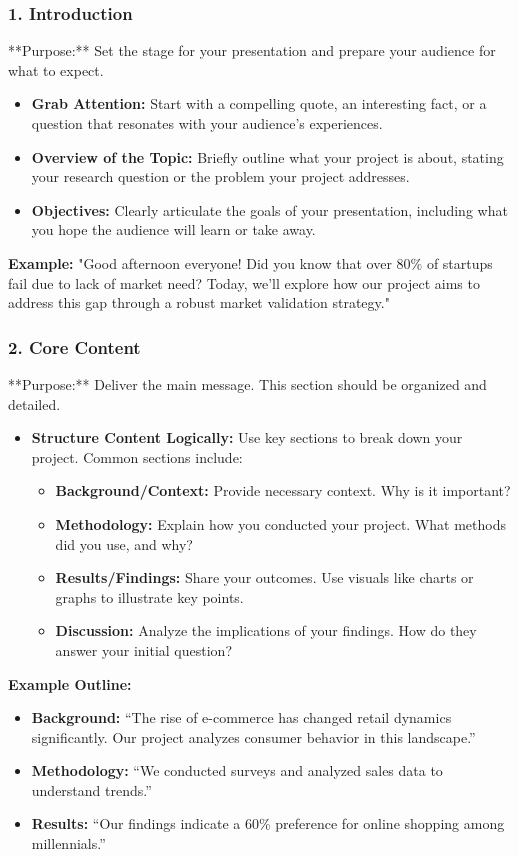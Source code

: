 \documentclass{beamer}
\begin{document}
\begin{frame}[fragile]
    \frametitle{1. Introduction}
    **Purpose:** Set the stage for your presentation and prepare your audience for what to expect.
    \begin{itemize}
        \item \textbf{Grab Attention:} Start with a compelling quote, an interesting fact, or a question that resonates with your audience's experiences.
        \item \textbf{Overview of the Topic:} Briefly outline what your project is about, stating your research question or the problem your project addresses.
        \item \textbf{Objectives:} Clearly articulate the goals of your presentation, including what you hope the audience will learn or take away.
    \end{itemize}
    \textbf{Example:} "Good afternoon everyone! Did you know that over 80\% of startups fail due to lack of market need? Today, we’ll explore how our project aims to address this gap through a robust market validation strategy."
\end{frame}

\begin{frame}[fragile]
    \frametitle{2. Core Content}
    **Purpose:** Deliver the main message. This section should be organized and detailed.
    \begin{itemize}
        \item \textbf{Structure Content Logically:} Use key sections to break down your project. Common sections include:
        \begin{itemize}
            \item \textbf{Background/Context:} Provide necessary context. Why is it important?
            \item \textbf{Methodology:} Explain how you conducted your project. What methods did you use, and why?
            \item \textbf{Results/Findings:} Share your outcomes. Use visuals like charts or graphs to illustrate key points.
            \item \textbf{Discussion:} Analyze the implications of your findings. How do they answer your initial question?
        \end{itemize}
    \end{itemize}
    \textbf{Example Outline:}
    \begin{itemize}
        \item \textbf{Background:} “The rise of e-commerce has changed retail dynamics significantly. Our project analyzes consumer behavior in this landscape.”
        \item \textbf{Methodology:} “We conducted surveys and analyzed sales data to understand trends.”
        \item \textbf{Results:} “Our findings indicate a 60\% preference for online shopping among millennials.”
    \end{itemize}
\end{frame}
\end{document}
